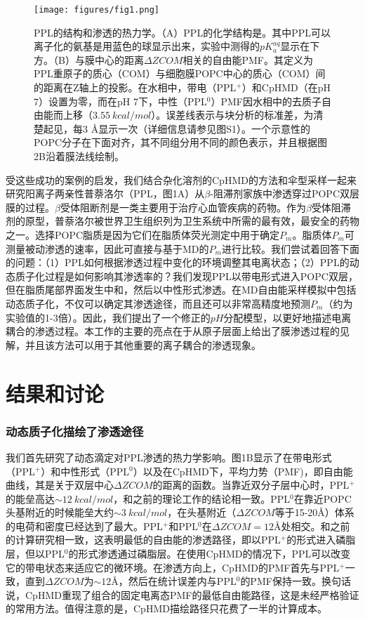\documentclass[journal=,manuscript=artical,email=false]{achemso}
\begin{document}
\begin{figure}[h]
\centering
\texttt{[image: figures/fig1.png]}
\caption{PPL的结构和渗透的热力学。（A）PPL的化学结构是。其中PPL可以离子化的氨基是用蓝色的球显示出来，实验中测得的$pK^{aq}_a$显示在下方。（B）与膜中心的距离$\Delta ZCOM$相关的自由能PMF。其定义为PPL重原子的质心（COM）与细胞膜POPC中心的质心（COM）间的距离在Z轴上的投影。在水相中，带电（PPL$^{+}$）和CpHMD（在pH $7$）设置为零，而在pH 7下，中性（PPL$^{0}$）PMF因水相中的去质子自由能而上移（$3.55~kcal / mol$）。误差线表示与块分析的标准差，为清楚起见，每$3$ \AA 显示一次（详细信息请参见图S1）。一个示意性的POPC分子在下面对齐，其不同组分用不同的颜色表示，并且根据图2B沿着膜法线绘制。}
\label{fig:fig1}
\end{figure}

受这些成功的案例的启发，我们结合杂化溶剂的CpHMD的方法和伞型采样一起来研究阳离子两亲性普萘洛尔（PPL，图1A）从$\beta$-阻滞剂家族中渗透穿过POPC双层膜的过程。$\beta$受体阻断剂是一类主要用于治疗心血管疾病的药物。作为$\beta$受体阻滞剂的原型，普萘洛尔被世界卫生组织列为卫生系统中所需的最有效，最安全的药物之一。选择POPC脂质是因为它们在脂质体荧光测定中用于确定$P_m$。脂质体$P_m$可测量被动渗透的速率，因此可直接与基于MD的$P_m$进行比较。我们尝试着回答下面的问题：（1）PPL如何根据渗透过程中变化的环境调整其电离状态；（2）PPL的动态质子化过程是如何影响其渗透率的？我们发现PPL以带电形式进入POPC双层，但在脂质尾部界面发生中和，然后以中性形式渗透。在MD自由能采样模拟中包括动态质子化，不仅可以确定其渗透途径，而且还可以非常高精度地预测$P_m$（约为实验值的1-3倍）。因此，我们提出了一个修正的$pH$分配模型，以更好地描述电离耦合的渗透过程。本工作的主要的亮点在于从原子层面上给出了膜渗透过程的见解，并且该方法可以用于其他重要的离子耦合的渗透现象。

\section{结果和讨论}
\subsubsection{动态质子化描绘了渗透途径}
我们首先研究了动态滴定对PPL渗透的热力学影响。图1B显示了在带电形式（PPL$^{+}$）和中性形式（PPL$^0$）以及在CpHMD下，平均力势（PMF)，即自由能曲线，其是关于双层中心$\Delta ZCOM$的距离的函数。当靠近双分子层中心时，PPL$^{+}$的能垒高达$\sim 12~kcal/mol$，和之前的理论工作的结论相一致。PPL$^{0}$在靠近POPC头基附近的时候能垒大约$\sim 3 ~kcal/mol$，在头基附近（$\Delta ZCOM$等于15-20\AA ）体系的电荷和密度已经达到了最大。PPL$^+$和PPL$^0$在$\Delta ZCOM = 12$\AA 处相交。和之前的计算研究相一致，这表明最低的自由能的渗透路径，即以PPL$^{+}$的形式进入磷脂层，但以PPL$^{0}$的形式渗透通过磷脂层。在使用CpHMD的情况下，PPL可以改变它的带电状态来适应它的微环境。在渗透方向上，CpHMD的PMF首先与PPL$^{+}$一致，直到$\Delta ZCOM$为$\sim 12$\AA，然后在统计误差内与PPL$^{0}$的PMF保持一致。换句话说，CpHMD重现了组合的固定电离态PMF的最低自由能路径，这是未经严格验证的常用方法。值得注意的是，CpHMD描绘路径只花费了一半的计算成本。
\end{document}

